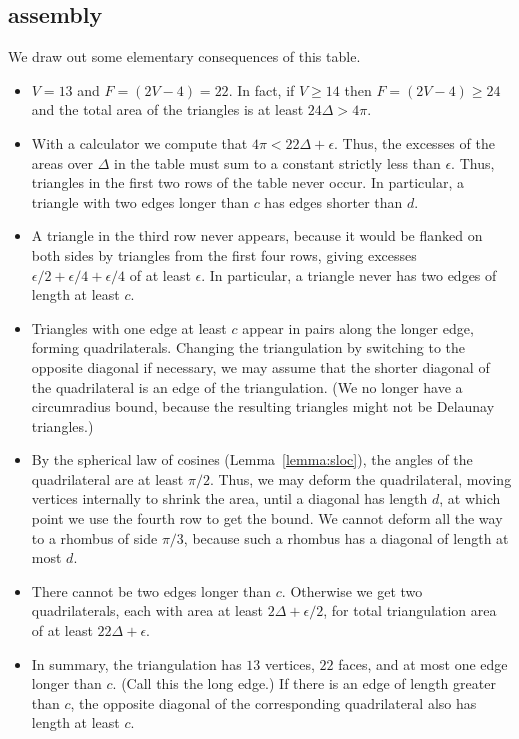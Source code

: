 \subsection{assembly}

We draw out some elementary consequences of this table.

\begin{itemize}
  \item $V=13$ and $F=(2V-4)=22$.  In fact, if $V\ge14$ then $F= (2V-4)\ge 24$ and
  the total area of the triangles is at least $24\Delta > 4\pi$.
  \item With a calculator we compute that $4\pi < 22\Delta+\epsilon$.
  Thus, the excesses of the areas over
  $\Delta$ in the table must sum to a constant strictly less than
  $\epsilon$.  Thus, triangles in the first two rows of the table
  never occur.  In particular, a triangle with two edges longer
  than $c$ has edges shorter than $d$.
  \item A triangle in the third row never appears, because it
  would be flanked on both sides by triangles from the first four rows,
  giving excesses $\epsilon/2 + \epsilon/4 + \epsilon/4$ of at
  least $\epsilon$. In particular, a triangle never has two edges
  of length at least $c$.
  \item Triangles with one edge at least $c$ appear in pairs
  along the longer edge, forming quadrilaterals.  Changing the
  triangulation by switching to the opposite diagonal if
  necessary, we may assume that the shorter diagonal of the
  quadrilateral is an edge of the triangulation.  (We no longer
  have a circumradius bound, because the resulting triangles might not be Delaunay
  triangles.)
  \item 
  By the spherical law of cosines (Lemma~\ref{lemma:sloc}), the angles of the quadrilateral are
  at least $\pi/2$.  Thus, we may deform the quadrilateral, moving
  vertices internally to shrink the area, until a diagonal has length $d$, at which
  point we use the fourth row to get the bound.  We cannot deform all the way
  to a
  rhombus of side $\pi/3$, because such a rhombus has a diagonal
  of length at most $d$.
  \item There cannot be two edges longer than $c$.  Otherwise we
  get two quadrilaterals, each with area at least $2\Delta +
  \epsilon/2$, for total triangulation area of at least $22\Delta
  + \epsilon$.
  \item In summary, the triangulation has $13$ vertices, $22$
  faces, and at most one edge longer than $c$.  (Call this the long edge.)
  If there is an
  edge of length greater than $c$, the opposite diagonal of the
  corresponding quadrilateral also has length at least $c$.
\end{itemize}



